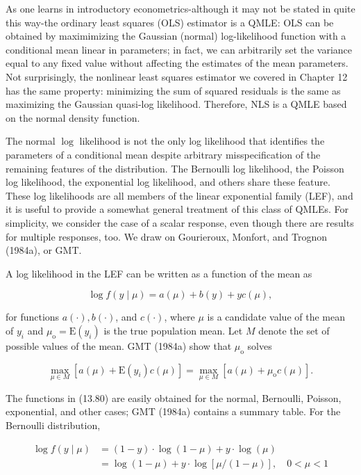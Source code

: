 \documentclass[10pt]{article}
\begin{document}
As one learns in introductory econometrics-although it may not be stated in quite this way-the ordinary least squares (OLS) estimator is a QMLE: OLS can be obtained by maximimizing the Gaussian (normal) log-likelihood function with a conditional mean linear in parameters; in fact, we can arbitrarily set the variance equal to any fixed value without affecting the estimates of the mean parameters. Not surprisingly, the nonlinear least squares estimator we covered in Chapter 12 has the same property: minimizing the sum of squared residuals is the same as maximizing the Gaussian quasi-log likelihood. Therefore, NLS is a QMLE based on the normal density function.

The normal $\log$ likelihood is not the only log likelihood that identifies the parameters of a conditional mean despite arbitrary misspecification of the remaining features of the distribution. The Bernoulli log likelihood, the Poisson log likelihood, the exponential log likelihood, and others share these feature. These log likelihoods are all members of the linear exponential family (LEF), and it is useful to provide a somewhat general treatment of this class of QMLEs. For simplicity, we consider the case of a scalar response, even though there are results for multiple responses, too. We draw on Gourieroux, Monfort, and Trognon (1984a), or GMT.

A log likelihood in the LEF can be written as a function of the mean as


\begin{equation*}
\log f(y \mid \mu)=a(\mu)+b(y)+y c(\mu), \tag{13.80}
\end{equation*}


for functions $a(\cdot), b(\cdot)$, and $c(\cdot)$, where $\mu$ is a candidate value of the mean of $y_{i}$ and $\mu_{\mathrm{o}}=\mathrm{E}\left(y_{i}\right)$ is the true population mean. Let $M$ denote the set of possible values of the mean. GMT (1984a) show that $\mu_{\mathrm{o}}$ solves


\begin{equation*}
\max _{\mu \in M}\left[a(\mu)+\mathrm{E}\left(y_{i}\right) c(\mu)\right]=\max _{\mu \in M}\left[a(\mu)+\mu_{\mathrm{o}} c(\mu)\right] . \tag{13.81}
\end{equation*}


The functions in (13.80) are easily obtained for the normal, Bernoulli, Poisson, exponential, and other cases; GMT (1984a) contains a summary table. For the Bernoulli distribution,

$$
\begin{aligned}
\log f(y \mid \mu) & =(1-y) \cdot \log (1-\mu)+y \cdot \log (\mu) \\
& =\log (1-\mu)+y \cdot \log [\mu /(1-\mu)], \quad 0<\mu<1
\end{aligned}
$$
\end{document}

